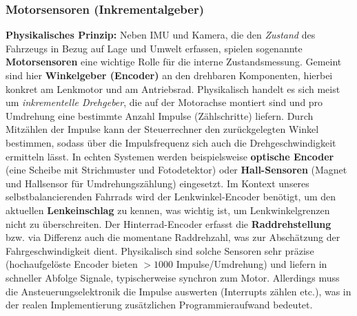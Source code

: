 
  \subsubsection{Motorsensoren (Inkrementalgeber)}
  \textbf{Physikalisches Prinzip:} Neben IMU und Kamera, die den \textit{Zustand} des Fahrzeugs in Bezug auf Lage und Umwelt erfassen, 
  spielen sogenannte \textbf{Motorsensoren} eine wichtige Rolle für die interne Zustandsmessung. 
  Gemeint sind hier \textbf{Winkelgeber (Encoder)} an den drehbaren Komponenten, hierbei konkret am Lenkmotor und am Antriebsrad. 
  Physikalisch handelt es sich meist um \textit{inkrementelle Drehgeber}, 
  die auf der Motorachse montiert sind und pro Umdrehung eine bestimmte Anzahl Impulse (Zählschritte) liefern. 
  Durch Mitzählen der Impulse kann der Steuerrechner den zurückgelegten Winkel bestimmen, sodass
  über die Impulsfrequenz sich auch die Drehgeschwindigkeit ermitteln lässt. In echten Systemen werden beispielsweise \textbf{optische Encoder} (eine Scheibe mit Strichmuster und Fotodetektor) 
  oder \textbf{Hall-Sensoren} (Magnet und Hallsensor für Umdrehungszählung) eingesetzt. 
  Im Kontext unseres selbstbalancierenden Fahrrads wird der Lenkwinkel-Encoder benötigt, 
  um den aktuellen \textbf{Lenkeinschlag} zu kennen, was wichtig ist, um Lenkwinkelgrenzen nicht zu überschreiten.
  Der Hinterrad-Encoder erfasst die \textbf{Raddrehstellung} bzw. via Differenz auch die momentane Raddrehzahl, 
  was zur Abschätzung der Fahrgeschwindigkeit dient. 
  Physikalisch sind solche Sensoren sehr präzise (hochaufgelöste Encoder bieten $>1000$ Impulse/Umdrehung) 
  und liefern in schneller Abfolge Signale, typischerweise synchron zum Motor. 
  Allerdings muss die Ansteuerungselektronik die Impulse auswerten (Interrupts zählen etc.), 
  was in der realen Implementierung zusätzlichen Programmieraufwand bedeutet.
  
